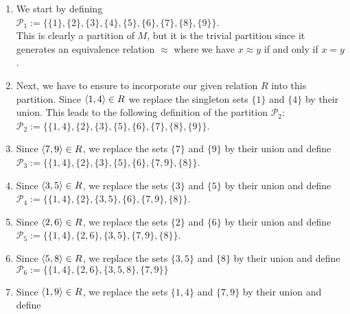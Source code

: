 \begin{enumerate}
\item We start by defining
      \\[0.2cm]
      \hspace*{1.3cm}
      $\mathcal{P}_1 := \bigl\{ \{1\}, \{2\}, \{3\}, \{4\}, \{5\}, \{6\}, \{7\}, \{8\}, \{9\} \bigr\}$.
      \\[0.2cm]
      This is clearly a partition of $M$, but it is the trivial partition since it generates an equivalence
      relation $\approx$ where we have  $x \approx y$ if and only if $x = y$.  
\item Next, we have to ensure to incorporate our given relation $R$ into this partition.  Since $\pair(1,4) \in R$
      we replace the singleton sets $\{1\}$ and $\{4\}$ by their union.  This leads to the following
      definition of the partition $\mathcal{P}_2$:
      \\[0.2cm]
      \hspace*{1.3cm}
      $\mathcal{P}_2 := \bigl\{ \{1, 4\}, \{2\}, \{3\}, \{5\}, \{6\}, \{7\}, \{8\}, \{9\} \bigr\}$.
\item Since $\pair(7,9) \in R$, we replace the sets $\{7\}$ and $\{9\}$ by their union and define
      \\[0.2cm]
      \hspace*{1.3cm}
      $\mathcal{P}_3 := \bigl\{ \{1, 4\}, \{2\}, \{3\}, \{5\}, \{6\}, \{7, 9\}, \{8\} \bigr\}$.
\item Since $\pair(3,5) \in R$, we replace the sets $\{3\}$ and $\{5\}$ by their union and define
      \\[0.2cm]
      \hspace*{1.3cm}
      $\mathcal{P}_4 := \bigl\{ \{1, 4\}, \{2\}, \{3,5\}, \{6\}, \{7, 9\}, \{8\} \bigr\}$.
\item Since $\pair(2,6) \in R$, we replace the sets $\{2\}$ and $\{6\}$ by their union and define
      \\[0.2cm]
      \hspace*{1.3cm}
      $\mathcal{P}_5 := \bigl\{ \{1, 4\}, \{2,6\}, \{3,5\}, \{7, 9\}, \{8\} \bigr\}$.
\item Since $\pair(5,8) \in R$, we replace the sets $\{3,5\}$ and $\{8\}$ by their union and define
      \\[0.2cm]
      \hspace*{1.3cm}
      $\mathcal{P}_6 := \bigl\{ \{1, 4\}, \{2,6\}, \{3,5,8\}, \{7, 9\} \bigr\}$
\item Since $\pair(1,9) \in R$, we replace the sets $\{1,4\}$ and $\{7,9\}$ by their union and define

\end{enumerate}
